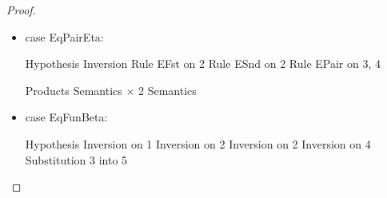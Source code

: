 \begin{proof}
\begin{itemize}
  \begin{eqnproof}[\interpE{\judgeE{\Gamma}{\snd{\pair{e_1}{e_2}}}{A_2}}\;\theta\;\gamma =]
          {Semantics}
          {Semantics}
          {Products}
  \end{eqnproof}

\item case EqPairEta: 
  \begin{eqnproof}
               {Hypothesis}
               {Inversion}
               {Rule EFst on 2}
               {Rule ESnd on 2}
               {Rule EPair on 3, 4}
  \end{eqnproof}

  \begin{eqnproof}[\interpE{\judgeE{\Gamma}{e}{A_1\times A_2}}\;\theta\;\gamma =]
            {Products}
            {Semantics $\times$ 2}
            {Semantics}    
  \end{eqnproof}

\item case EqFunBeta:

  \begin{eqnproof}
              {Hypothesis}
              {Inversion on 1}
              {Inversion on 2}
              {Inversion on 2}
              {Inversion on 4}
              {Substitution 3 into 5}
  \end{eqnproof}


\end{itemize}
\end{proof}
